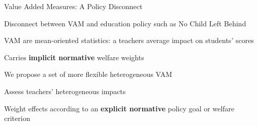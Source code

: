 \documentclass[t,aspectratio=169,11pt]{beamer}
\newenvironment{wideitemize}{\itemize\addtolength{\itemsep}{14pt}}{\enditemize}
\begin{document}
\begin{frame}{Value Added Measures: A Policy Disconnect  }
\begin{wideitemize}

    \item Disconnect between VAM and education policy such as No Child Left Behind
    \begin{wideitemize}
        \item VAM are mean-oriented statistics: a teachers average impact on students' scores
        \item Carries \textbf{implicit normative} welfare weights 
    \end{wideitemize}
    
    \item  We propose a set of more flexible heterogeneous VAM 
    \begin{wideitemize}
        \item Assess teachers' heterogeneous impacts
        \item  Weight effects according to an \textbf{explicit normative} policy goal or welfare criterion
    \end{wideitemize}


\end{wideitemize}

\end{frame}

\end{document}
